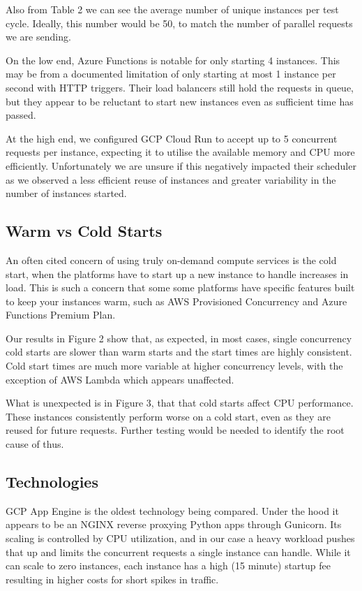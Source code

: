 \documentclass[11pt]{article}
\begin{document}
Also from Table 2 %
we can see the average number of unique instances per test cycle.
Ideally, this number would be 50,
to match the number of parallel requests we are sending.

On the low end,
Azure Functions is notable for only starting 4 instances.
This may be from a documented limitation %
of only starting at most 1 instance per second with HTTP triggers.
Their load balancers still hold the requests in queue,
but they appear to be reluctant to start new instances even as sufficient time has passed.

At the high end,
we configured GCP Cloud Run to accept up to 5 concurrent requests per instance,
expecting it to utilise the available memory and CPU more efficiently.
Unfortunately we are unsure if this negatively impacted their scheduler
as we observed a less efficient reuse of instances
and greater variability in the number of instances started.

\subsection{Warm vs Cold Starts}
An often cited concern of using truly on-demand compute services is the cold start,
when the platforms have to start up a new instance to handle increases in load.
This is such a concern that some some platforms have specific features
built to keep your instances warm, such as AWS Provisioned Concurrency %
and Azure Functions Premium Plan.

Our results in Figure 2 %
show that, as expected, in most cases,
single concurrency cold starts are slower than warm starts
and the start times are highly consistent.
Cold start times are much more variable at higher concurrency levels,
with the exception of AWS Lambda which appears unaffected.

What is unexpected is in Figure 3, %
that that cold starts affect CPU performance.
These instances consistently perform worse on a cold start,
even as they are reused for future requests.
Further testing would be needed to identify the root cause of thus.

\subsection{Technologies}
GCP App Engine is the oldest technology being compared.
Under the hood it appears to be an NGINX reverse proxying Python apps through Gunicorn.
Its scaling is controlled by CPU utilization,
and in our case a heavy workload pushes that up
and limits the concurrent requests a single instance can handle.
While it can scale to zero instances,
each instance has a high (15 minute) startup fee %
resulting in higher costs for short spikes in traffic.
\end{document}

